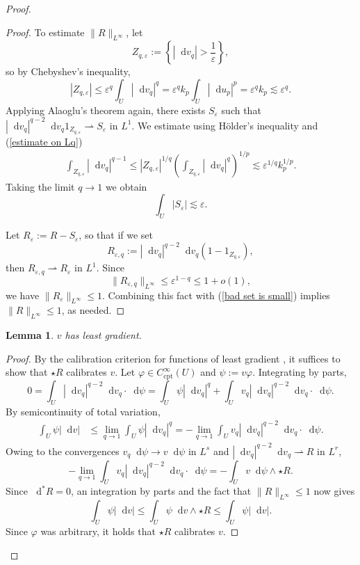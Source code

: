 \documentclass[reqno,11pt]{amsart}
\newcommand*\dif{\mathop{}\!\mathrm{d}}
\newcommand{\cpt}{\mathrm{cpt}}
\newtheorem{lemma}[theorem]{Lemma}
\theoremstyle{definition}
\numberwithin{equation}{section}
\begin{document}
\begin{proof}
\begin{proof}
To estimate $\|R\|_{L^\infty}$, let
$$Z_{q, \varepsilon} := \left\{|\dif v_q| > \frac{1}{\varepsilon}\right\},$$
so by Chebyshev's inequality,
$$|Z_{q, \varepsilon}| \leq \varepsilon^q \int_U |\dif v_q|^q = \varepsilon^q k_p \int_U |\dif u_p|^p = \varepsilon^q k_p \lesssim \varepsilon^q.$$
Applying Alaoglu's theorem again, there exists $S_\varepsilon$ such that $|\dif v_q|^{q - 2} \dif v_q 1_{Z_{q, \varepsilon}} \rightharpoonup S_\varepsilon$ in $L^1$.
We estimate using H\"older's inequality and (\ref{estimate on Lq})
\begin{align*}
\int_{Z_{q, \varepsilon}} |\dif v_q|^{q - 1} \leq |Z_{q, \varepsilon}|^{1/q} \left(\int_{Z_{q, \varepsilon}} |\dif v_q|^q\right)^{1/p} \lesssim \varepsilon^{1/q} k_p^{1/p}.
\end{align*}
Taking the limit $q \to 1$ we obtain 
\begin{equation}\label{bad set is small}
\int_U |S_\varepsilon| \lesssim \varepsilon.
\end{equation}

Let $R_\varepsilon := R - S_\varepsilon$, so that if we set
$$R_{\varepsilon, q} := |\dif v_q|^{q - 2} \dif v_q (1 - 1_{Z_{q, \varepsilon}}),$$
then $R_{\varepsilon, q} \rightharpoonup R_\varepsilon$ in $L^1$.
Since
$$\|R_{\varepsilon, q}\|_{L^\infty} \leq \varepsilon^{1 - q} \leq 1 + o(1),$$
we have $\|R_\varepsilon\|_{L^\infty} \leq 1$.
Combining this fact with (\ref{bad set is small}) implies $\|R\|_{L^\infty} \leq 1$, as needed.
\end{proof}

\begin{lemma}
$v$ has least gradient.
\end{lemma}
\begin{proof}
By the calibration criterion for functions of least gradient \cite[Theorem 1.1]{Mazon14}, it suffices to show that $\star R$ calibrates $v$.
Let $\varphi \in C^\infty_\cpt(U)$ and $\psi := v\varphi$.
Integrating by parts,
$$0 = \int_U |\dif v_q|^{q - 2} \dif v_q \cdot \dif \psi = \int_U \psi |\dif v_q|^q + \int_U v_q |\dif v_q|^{q - 2} \dif v_q \cdot \dif \psi.$$
By semicontinuity of total variation,
\begin{align*}
\int_U \psi |\dif v|
&\leq \lim_{q \to 1} \int_U \psi |\dif v_q|^q 
= -\lim_{q \to 1} \int_U v_q |\dif v_q|^{q - 2} \dif v_q \cdot \dif \psi.
\end{align*}
Owing to the convergences $v_q \dif \psi \to v \dif \psi$ in $L^s$ and $|\dif v_q|^{q - 2} \dif v_q \rightharpoonup R$ in $L^r$,
$$
-\lim_{q \to 1} \int_U v_q |\dif v_q|^{q - 2} \dif v_q \cdot \dif \psi = -\int_U v\dif \psi \wedge \star R.
$$
Since $\dif^* R = 0$, an integration by parts and the fact that $\|R\|_{L^\infty} \leq 1$ now gives
$$\int_U \psi |\dif v| \leq \int_U \psi \dif v \wedge \star R \leq \int_U \psi |\dif v|.$$
Since $\varphi$ was arbitrary, it holds that $\star R$ calibrates $v$.
\end{proof}


\end{proof}
\end{document}
